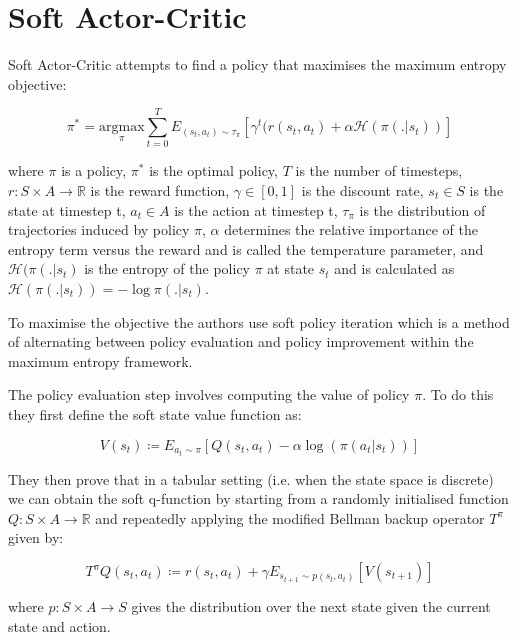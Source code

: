 \documentclass{article}
\begin{document}
\section{Soft Actor-Critic}

Soft Actor-Critic \citep{SAC} attempts to find a policy that maximises the maximum entropy objective:

\begin{equation}
\pi^* = \underset{\pi}{\mathrm{argmax}} \sum_{t=0}^{T} E_{(s_t, a_t) \sim \tau_{\pi}}[\gamma^t (r(s_t, a_t) + \alpha \mathcal{H}(\pi(.|s_t))]
\end{equation}

where $\pi$ is a policy, $\pi^*$ is the optimal policy, $T$ is the number of timesteps, $r : S \times A \to \mathbb{R}$ is the reward function, $\gamma \in [0, 1] $ is the discount rate, $s_t \in S$ is the state at timestep t, $a_t \in A$ is the action at timestep t, $\tau_{\pi}$ is the distribution of trajectories induced by policy $\pi$, $\alpha$ determines the relative importance of the entropy term versus the reward and is called the temperature parameter, and $\mathcal{H}(\pi(.|s_t)$ is the entropy of the policy $\pi$ at state $s_t$ and is calculated as $\mathcal{H}(\pi(.|s_t)) = -\log \pi(.|s_t) $. 

To maximise the objective the authors use soft policy iteration which is a method of alternating between policy evaluation and policy improvement within the maximum entropy framework. 

The policy evaluation step involves computing the value of policy $\pi$. To do this they first define the soft state value function as:

\begin{equation}
V(s_t) \coloneqq E_{a_t \sim \pi}[Q(s_t, a_t) - \alpha \log(\pi(a_t|s_t))]
\label{eq:soft_state_value}
\end{equation}

They then prove that in a tabular setting (i.e. when the state space is discrete) we can obtain the soft q-function by starting from a randomly initialised function $Q : S \times A \to \mathbb{R}$ and repeatedly applying the modified Bellman backup operator $T^{\pi}$ given by: 

\begin{equation}
T^{\pi}Q(s_t, a_t) \coloneqq r(s_t, a_t) + \gamma E_{s_{t+1} \sim p(s_t, a_t)} [V(s_{t+1})]
\label{eq:sac_backup}
\end{equation}

where $p: S \times A \to S$ gives the distribution over the next state given the current state and action.
\end{document}
